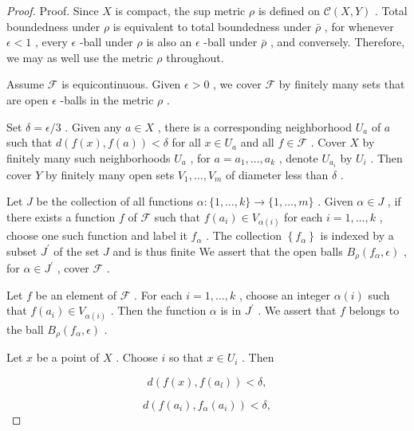 \begin{proof}
Proof. Since \(X\) is compact, the sup metric \(\rho\) is defined on \(\mathcal{C}\left( {X,Y}\right)\) . Total boundedness under \(\rho\) is equivalent to total boundedness under \(\bar{\rho }\) , for whenever \(\epsilon  < 1\) , every \(\epsilon\) -ball under \(\rho\) is also an \(\epsilon\) -ball under \(\bar{\rho }\) , and conversely. Therefore, we may as well use the metric \(\rho\) throughout.

Assume \(\mathcal{F}\) is equicontinuous. Given \(\epsilon  > 0\) , we cover \(\mathcal{F}\) by finitely many sets that are open \(\epsilon\) -balls in the metric \(\rho\) .

Set \(\delta  = \epsilon /3\) . Given any \(a \in  X\) , there is a corresponding neighborhood \({U}_{a}\) of \(a\) such that \(d\left( {f\left( x\right) ,f\left( a\right) }\right)  < \delta\) for all \(x \in  {U}_{a}\) and all \(f \in  \mathcal{F}\) . Cover \(X\) by finitely many such neighborhoods \({U}_{a}\) , for \(a = {a}_{1},\ldots ,{a}_{k}\) , denote \({U}_{{a}_{i}}\) by \({U}_{i}\) . Then cover \(Y\) by finitely many open sets \({V}_{1},\ldots ,{V}_{m}\) of diameter less than \(\delta\) .

Let \(J\) be the collection of all functions \(\alpha  : \{ 1,\ldots ,k\}  \rightarrow  \{ 1,\ldots ,m\}\) . Given \(\alpha  \in  J\) , if there exists a function \(f\) of \(\mathcal{F}\) such that \(f\left( {a}_{i}\right)  \in  {V}_{\alpha \left( i\right) }\) for each \(i = 1,\ldots ,k\) , choose one such function and label it \({f}_{\alpha }\) . The collection \(\left\{  {f}_{\alpha }\right\}\) is indexed by a subset \({J}^{\prime }\) of the set \(J\) and is thus finite We assert that the open balls \({B}_{\rho }\left( {{f}_{\alpha },\epsilon }\right)\) , for \(\alpha  \in  {J}^{\prime }\) , cover \(\mathcal{F}\) .

Let \(f\) be an element of \(\mathcal{F}\) . For each \(i = 1,\ldots ,k\) , choose an integer \(\alpha \left( i\right)\) such that \(f\left( {a}_{i}\right)  \in  {V}_{\alpha \left( i\right) }\) . Then the function \(\alpha\) is in \({J}^{\prime }\) . We assert that \(f\) belongs to the ball \({B}_{\rho }\left( {{f}_{\alpha },\epsilon }\right)\) .

Let \(x\) be a point of \(X\) . Choose \(i\) so that \(x \in  {U}_{i}\) . Then

\[
d\left( {f\left( x\right) ,f\left( {a}_{l}\right) }\right)  < \delta ,
\]

\[
d\left( {f\left( {a}_{i}\right) ,{f}_{\alpha }\left( {a}_{i}\right) }\right)  < \delta ,
\]


\end{proof}
